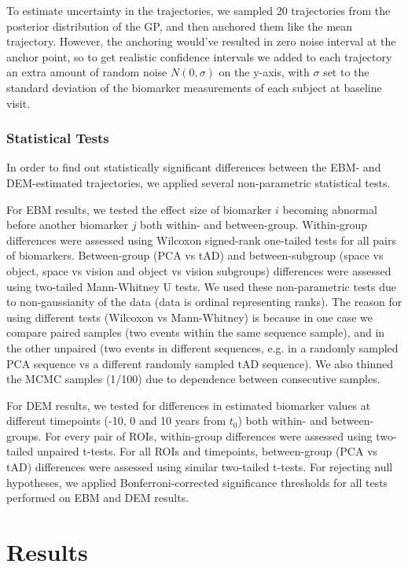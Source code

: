 To estimate uncertainty in the trajectories, we sampled 20 trajectories from the posterior distribution of the GP, and then anchored them like the mean trajectory. However, the anchoring would've resulted in zero noise interval at the anchor point, so to get realistic confidence intervals we added to each trajectory an extra amount of random noise $N(0, \sigma)$ on the y-axis, with $\sigma$ set to the standard deviation of the biomarker measurements of each subject at baseline visit.

\subsubsection{Statistical Tests}

In order to find out statistically significant differences between the EBM- and DEM-estimated trajectories, we applied several non-parametric statistical tests. 

For EBM results, we tested the effect size of  biomarker $i$ becoming abnormal before another biomarker $j$ both within- and between-group. Within-group differences were assessed using Wilcoxon signed-rank one-tailed tests for all pairs of biomarkers. Between-group (PCA vs tAD) and between-subgroup (space vs object, space vs vision and object vs vision subgroups) differences were assessed using two-tailed Mann-Whitney U tests. We used these non-parametric tests due to non-gaussianity of the data (data is ordinal representing ranks). The reason for using different tests (Wilcoxon vs Mann-Whitney) is because in one case we compare paired samples (two events within the same sequence sample), and in the other unpaired (two events in different sequences, e.g. in a randomly sampled PCA sequence vs a different randomly sampled tAD sequence). We also thinned the MCMC samples (1/100) due to dependence between consecutive samples. 

For DEM results, we tested for differences in estimated biomarker values at different timepoints (-10, 0 and 10 years from $t_0$) both within- and between-groups. For every pair of ROIs, within-group differences were assessed using two-tailed unpaired t-tests. For all ROIs and timepoints, between-group (PCA vs tAD) differences were assessed using similar two-tailed t-tests. For rejecting null hypotheses, we applied Bonferroni-corrected significance thresholds for all tests performed on EBM and DEM results.

\section{Results}
 
